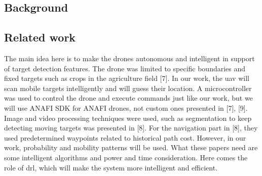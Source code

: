 \documentclass[../main.tex]{subfiles}
\begin{document}
\subsection{Background}



\subsection{Related work}




The main idea here is to make the drones autonomous and intelligent in support of target detection features. The drone was limited to specific boundaries and fixed targets such as crops in the agriculture field [7].
In our work, the \gls{uav} will scan mobile targets intelligently and will guess their location.
 A microcontroller was used to control the drone and execute commands just like our work, but we will use ANAFI SDK for ANAFI drones, not custom ones presented in [7], [9]. 
Image and video processing techniques were used, such as segmentation to keep detecting moving targets was presented in [8].
For the navigation part in [8], they used predetermined waypoints related to historical path cost. However, in our work, probability and mobility patterns will be used. What these papers need are some intelligent algorithms and power and time consideration. Here comes the role of \gls{drl}, which will make the system more intelligent and efficient.
\end{document}
